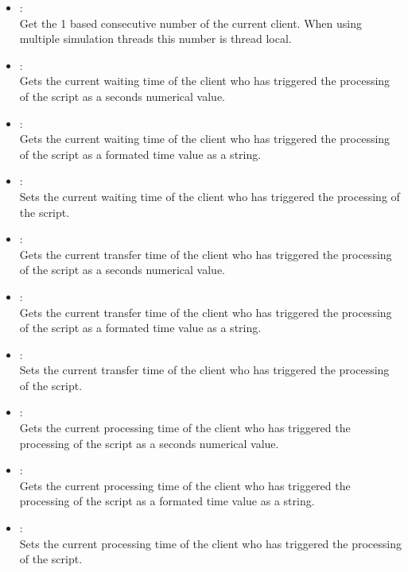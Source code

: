 \begin{itemize}
\item
{}:\\
Get the 1 based consecutive number of the current client.
When using multiple simulation threads this number is thread local.
  
\item
{}:\\
Gets the current waiting time of the client who has triggered the processing of the script as a seconds numerical value.
  
\item
{}:\\
Gets the current waiting time of the client who has triggered the processing of the script as a formated time value as a string.
    
\item
{}:\\
Sets the current waiting time of the client who has triggered the processing of the script.
  
\item
{}:\\
Gets the current transfer time of the client who has triggered the processing of the script as a seconds numerical value.
  
\item
{}:\\
Gets the current transfer time of the client who has triggered the processing of the script as a formated time value as a string.
  
\item
{}:\\
Sets the current transfer time of the client who has triggered the processing of the script.
  
\item
{}:\\
Gets the current processing time of the client who has triggered the processing of the script as a seconds numerical value.
  
\item
{}:\\
Gets the current processing time of the client who has triggered the processing of the script as a formated time value as a string.
  
\item
{}:\\
Sets the current processing time of the client who has triggered the processing of the script.
  

\end{itemize}
